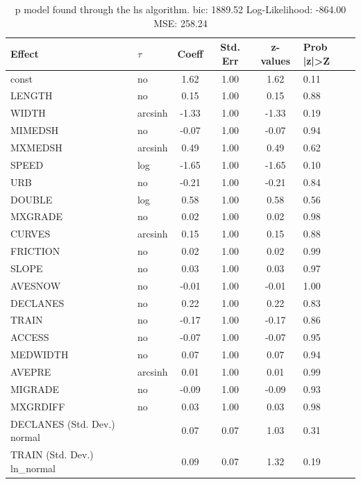 \begin{table}
	\caption{p model found through the hs algorithm. bic: 1889.52 Log-Likelihood: -864.00 MSE: 258.24}
	\begin{center}
		\begin{tabular}{|l|l|c|c|c|l|}
			\hline
			Effect & $\tau$ & Coeff & Std. Err & z-values & Prob |z|>Z \\
			\hline
			const & no & 1.62 & 1.00 & 1.62 & 0.11 \\
			\hline
			LENGTH & no & 0.15 & 1.00 & 0.15 & 0.88 \\
			\hline
			WIDTH & arcsinh & -1.33 & 1.00 & -1.33 & 0.19 \\
			\hline
			MIMEDSH & no & -0.07 & 1.00 & -0.07 & 0.94 \\
			\hline
			MXMEDSH & arcsinh & 0.49 & 1.00 & 0.49 & 0.62 \\
			\hline
			SPEED & log & -1.65 & 1.00 & -1.65 & 0.10 \\
			\hline
			URB & no & -0.21 & 1.00 & -0.21 & 0.84 \\
			\hline
			DOUBLE & log & 0.58 & 1.00 & 0.58 & 0.56 \\
			\hline
			MXGRADE & no & 0.02 & 1.00 & 0.02 & 0.98 \\
			\hline
			CURVES & arcsinh & 0.15 & 1.00 & 0.15 & 0.88 \\
			\hline
			FRICTION & no & 0.02 & 1.00 & 0.02 & 0.99 \\
			\hline
			SLOPE & no & 0.03 & 1.00 & 0.03 & 0.97 \\
			\hline
			AVESNOW & no & -0.01 & 1.00 & -0.01 & 1.00 \\
			\hline
			DECLANES & no & 0.22 & 1.00 & 0.22 & 0.83 \\
			\hline
			TRAIN & no & -0.17 & 1.00 & -0.17 & 0.86 \\
			\hline
			ACCESS & no & -0.07 & 1.00 & -0.07 & 0.95 \\
			\hline
			MEDWIDTH & no & 0.07 & 1.00 & 0.07 & 0.94 \\
			\hline
			AVEPRE & arcsinh & 0.01 & 1.00 & 0.01 & 0.99 \\
			\hline
			MIGRADE & no & -0.09 & 1.00 & -0.09 & 0.93 \\
			\hline
			MXGRDIFF & no & 0.03 & 1.00 & 0.03 & 0.98 \\
			\hline
			DECLANES (Std. Dev.) normal &  & 0.07 & 0.07 & 1.03 & 0.31 \\
			\hline
			TRAIN (Std. Dev.) ln_normal &  & 0.09 & 0.07 & 1.32 & 0.19 \\
			\hline

\end{tabular}
\end{center}
\end{table}
